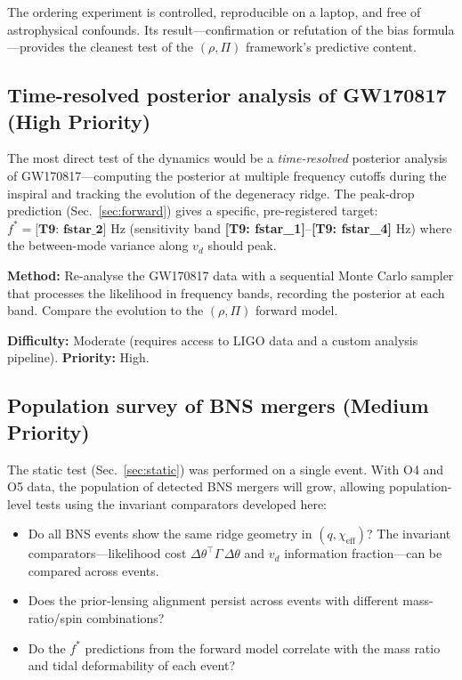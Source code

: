 \documentclass[twocolumn,prd,showpacs,superscriptaddress]{revtex4-2}
\newcommand{\vd}{v_{d}}          %
\newcommand{\manifest}[1]{\textbf{[#1]}}
\begin{document}
The ordering experiment is controlled, reproducible on a laptop, and free of astrophysical confounds. Its result---confirmation or refutation of the bias formula---provides the cleanest test of the $(\rho, \Pi)$ framework's predictive content.

\subsection{Time-resolved posterior analysis of GW170817 (High Priority)}

The most direct test of the dynamics would be a \emph{time-resolved} posterior analysis of GW170817---computing the posterior at multiple frequency cutoffs during the inspiral and tracking the evolution of the degeneracy ridge. The peak-drop prediction (Sec.~\ref{sec:forward}) gives a specific, pre-registered target: $f^* = \manifest{T9: fstar_2}$ Hz (sensitivity band \manifest{T9: fstar_1}--\manifest{T9: fstar_4} Hz) where the between-mode variance along $\vd$ should peak.

\textbf{Method:} Re-analyse the GW170817 data with a sequential Monte Carlo sampler that processes the likelihood in frequency bands, recording the posterior at each band. Compare the evolution to the $(\rho, \Pi)$ forward model.

\textbf{Difficulty:} Moderate (requires access to LIGO data and a custom analysis pipeline). \textbf{Priority:} High.

\subsection{Population survey of BNS mergers (Medium Priority)}

The static test (Sec.~\ref{sec:static}) was performed on a single event. With O4 and O5 data, the population of detected BNS mergers will grow, allowing population-level tests using the invariant comparators developed here:

\begin{itemize}
\item Do all BNS events show the same ridge geometry in $(q, \chi_{\text{eff}})$? The invariant comparators---likelihood cost $\Delta\theta^\top\Gamma\,\Delta\theta$ and $\vd$ information fraction---can be compared across events.
\item Does the prior-lensing alignment persist across events with different mass-ratio/spin combinations?
\item Do the $f^*$ predictions from the forward model correlate with the mass ratio and tidal deformability of each event?
\end{itemize}
\end{document}
